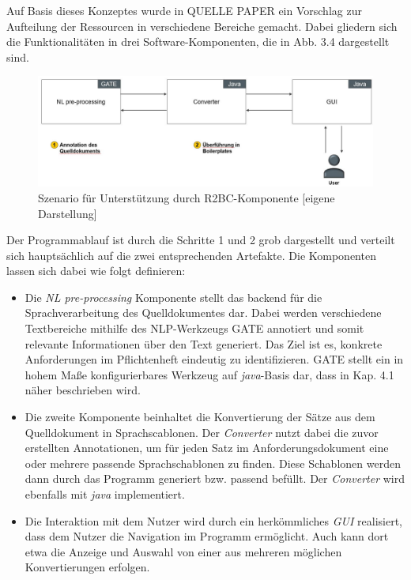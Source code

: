 \documentclass[12pt]{report}
\begin{document}
Auf Basis dieses Konzeptes wurde in QUELLE PAPER ein Vorschlag zur Aufteilung der Ressourcen in verschiedene Bereiche gemacht. Dabei gliedern sich die Funktionalitäten in drei Software-Komponenten, die in Abb. 3.4 dargestellt sind.
\begin{figure}[h!]
\begin{center}
\includegraphics[scale=0.5]{Bilder/Verteilung-R2BC.jpg}
\caption{Szenario für Unterstützung durch R2BC-Komponente [eigene Darstellung]}
\end{center}
\end{figure}
Der Programmablauf ist durch die Schritte 1 und 2 grob dargestellt und verteilt sich hauptsächlich auf die zwei entsprechenden Artefakte. Die Komponenten lassen sich dabei wie folgt definieren:
\begin{itemize}
\item Die \textit{NL pre-processing} Komponente stellt das backend für die Sprachverarbeitung des Quelldokumentes dar. Dabei werden verschiedene Textbereiche mithilfe des NLP-Werkzeugs GATE annotiert und somit relevante Informationen über den Text generiert. Das Ziel ist es, konkrete Anforderungen im Pflichtenheft eindeutig zu identifizieren. GATE stellt ein in hohem Maße konfigurierbares Werkzeug auf \textit{java}-Basis dar, dass in Kap. 4.1 näher beschrieben wird.
\item Die zweite Komponente beinhaltet die Konvertierung der Sätze aus dem Quelldokument in Sprachscablonen. Der \textit{Converter} nutzt dabei die zuvor erstellten Annotationen, um für jeden Satz im Anforderungsdokument eine oder mehrere passende Sprachschablonen zu finden. Diese Schablonen werden dann durch das Programm generiert bzw. passend \glqq befüllt\grqq{}. Der \textit{Converter} wird ebenfalls mit \textit{java} implementiert.
\item Die Interaktion mit dem Nutzer wird durch ein herkömmliches \textit{GUI} realisiert, dass dem Nutzer die Navigation im Programm ermöglicht. Auch kann dort etwa die Anzeige und Auswahl von einer aus mehreren möglichen Konvertierungen erfolgen.
\end{itemize}
\end{document}

